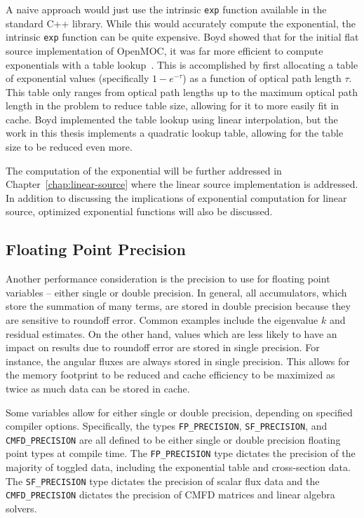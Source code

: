 A naive approach would just use the intrinsic \texttt{exp} function available in the standard C++ library. While this would accurately compute the exponential, the intrinsic \texttt{exp} function can be quite expensive. Boyd showed that for the initial flat source implementation of OpenMOC, it was far more efficient to compute exponentials with a table lookup~\cite{boyd2014openmoc}. This is accomplished by first allocating a table of exponential values (specifically $1-e^{-\tau}$) as a function of optical path length $\tau$. This table only ranges from optical path lengths up to the maximum optical path length in the problem to reduce table size, allowing for it to more easily fit in cache. Boyd implemented the table lookup using linear interpolation, but the work in this thesis implements a quadratic lookup table, allowing for the table size to be reduced even more.

The computation of the exponential will be further addressed in Chapter~\ref{chap:linear-source} where the linear source implementation is addressed. In addition to discussing the implications of exponential computation for linear source, optimized exponential functions will also be discussed.

\subsection{Floating Point Precision}

Another performance consideration is the precision to use for floating point variables -- either single or double precision. In general, all accumulators, which store the summation of many terms, are stored in double precision because they are sensitive to roundoff error. Common examples include the eigenvalue $k$ and residual estimates. On the other hand, values which are less likely to have an impact on results due to roundoff error are stored in single precision.  For instance, the angular fluxes are always stored in single precision. This allows for the memory footprint to be reduced and cache efficiency to be maximized as twice as much data can be stored in cache.

Some variables allow for either single or double precision, depending on specified compiler options. Specifically, the types \texttt{FP_PRECISION}, \texttt{SF_PRECISION}, and \texttt{CMFD_PRECISION} are all defined to be either single or double precision floating point types at compile time. The \texttt{FP_PRECISION} type dictates the precision of the majority of toggled data, including the exponential table and cross-section data.  The \texttt{SF_PRECISION} type dictates the precision of scalar flux data and the \texttt{CMFD_PRECISION} dictates the precision of CMFD matrices and linear algebra solvers.

